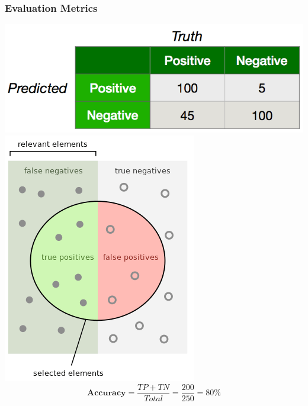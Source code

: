 \begin{frame}
\frametitle{Evaluation Metrics}
\includegraphics[scale=0.25]{figures/classifiers/evalex1.png}
\\
\centering
\includegraphics[scale=0.25]{figures/classifiers/evalterms.png}
\begin{equation*}
\textbf{Accuracy} = \frac{TP + TN}{Total} = \frac{200}{250} = 80\%
\end{equation*}
\end{frame}

